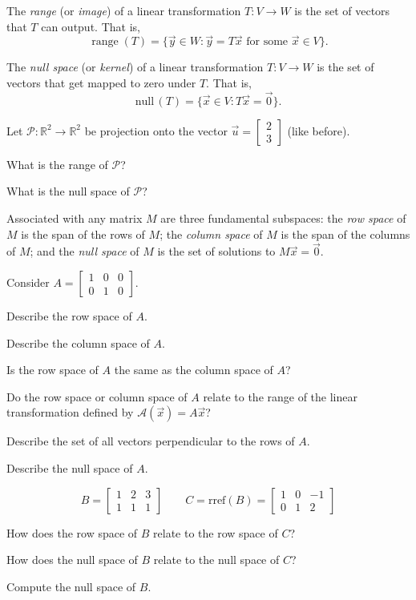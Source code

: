 \documentclass[14pt]{problemset}
\newcommand{\R}{\mathbb{R}}
\newcommand{\Null}{\mathrm{null}\,}
\newcommand{\rref}{\mathrm{rref}}
\newcommand{\mat}[1]{\begin{bmatrix}#1\end{bmatrix}}
\newcommand{\Range}{\operatorname{range}}
\begin{document}
\newpage
	\begin{definition}[Range]
		The \emph{range} (or \emph{image}) of a linear transformation $T:V\to W$ is the set of vectors that
		$T$ can output.  That is,
		\[
			\Range(T)=\{\vec y\in W:\vec y=T\vec x\text{ for some }\vec x\in V\}.
		\]
	\end{definition}
	\begin{definition}
		The \emph{null space} (or \emph{kernel}) of a linear transformation $T:V\to W$ is the
		set of vectors that get mapped to zero under $T$.  That is,
		\[
			\Null(T)=\{\vec x\in V:T\vec x=\vec 0\}.
		\]
	\end{definition}

	\question
	Let $\mathcal P:\R^2\to\R^2$ be projection onto the vector $\vec u=\mat{2\\3}$ (like before).
	\begin{parts}
		\item What is the range of $\mathcal P$?
		\item What is the null space of $\mathcal P$?
	\end{parts}


	\begin{definition}
		Associated with any matrix $M$ are three fundamental subspaces: the \emph{row space}
		of $M$ is the span of the rows of $M$; the \emph{column space} of $M$ is the span
		of the columns of $M$; and the \emph{null space} of $M$ is the set of solutions
		to $M\vec x=\vec 0$. 
		
	\end{definition}

	\question
	Consider $A=\mat{1&0&0\\0&1&0}$.
	\begin{parts}
		\item Describe the row space of $A$.
		\item Describe the column space of $A$.
		\item Is the row space of $A$ the same as the column space of $A$?
		\item Do the row space or column space of $A$ relate to the range
			of the linear transformation defined by $\mathcal A(\vec x) = A\vec x$?
		\item Describe the set of all vectors perpendicular to the rows of $A$.
		\item Describe the null space of $A$.
	\end{parts}

	\question
	\[
		B=\mat{1&2&3\\1&1&1}\qquad C=\rref(B)=\mat{1&0&-1\\0&1&2}
	\]
	\begin{parts}
		\item How does the row space of $B$ relate to the row space of $C$?
		\item How does the null space of $B$ relate to the null space of $C$?
		\item Compute the null space of $B$.
	\end{parts}
\end{document}
